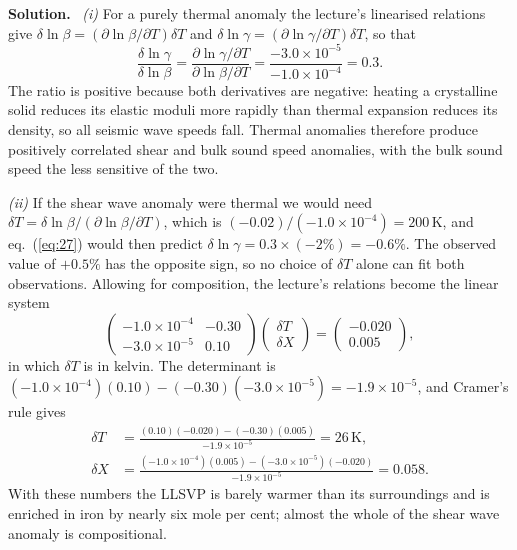 \documentclass[a4paper,12pt]{paper}
\newenvironment{solution}{\par\noindent\textbf{Solution.}\ }{\par\medskip}
\begin{document}
\begin{solution}
\textit{(i)} For a purely thermal anomaly the lecture's linearised relations give
$\delta\ln\beta=(\partial\ln\beta/\partial T)\delta T$ and
$\delta\ln\gamma=(\partial\ln\gamma/\partial T)\delta T$, so that
\begin{equation}
\frac{\delta\ln\gamma}{\delta\ln\beta}=\frac{\partial\ln\gamma/\partial T}{\partial\ln\beta/\partial T}
=\frac{-3.0\times10^{-5}}{-1.0\times10^{-4}}=0.3 .
\label{eq:27}
\end{equation}
The ratio is positive because both derivatives are negative: heating a crystalline solid
reduces its elastic moduli more rapidly than thermal expansion reduces its density, so all
seismic wave speeds fall. Thermal anomalies therefore produce positively correlated shear and
bulk sound speed anomalies, with the bulk sound speed the less sensitive of the two.

\medskip
\noindent\textit{(ii)} If the shear wave anomaly were thermal we would need
$\delta T=\delta\ln\beta/(\partial\ln\beta/\partial T)$, which is
$(-0.02)/(-1.0\times10^{-4})=200\,\mathrm{K}$, and eq.~(\ref{eq:27}) would then predict $\delta\ln\gamma=0.3\times(-2\%)=-0.6\%$. The observed
value of $+0.5\%$ has the opposite sign, so no choice of $\delta T$ alone can fit both
observations. Allowing for composition, the lecture's relations become the linear system
\begin{equation}
\begin{pmatrix}-1.0\times10^{-4}&-0.30\\ -3.0\times10^{-5}&0.10\end{pmatrix}
\begin{pmatrix}\delta T\\ \delta X\end{pmatrix}
=\begin{pmatrix}-0.020\\ 0.005\end{pmatrix},
\label{eq:28}
\end{equation}
in which $\delta T$ is in kelvin. The determinant is
$(-1.0\times10^{-4})(0.10)-(-0.30)(-3.0\times10^{-5})=-1.9\times10^{-5}$, and Cramer's rule gives
\begin{align}
\delta T&=\frac{(0.10)(-0.020)-(-0.30)(0.005)}{-1.9\times10^{-5}}=26\,\mathrm{K},\nonumber\\
\delta X&=\frac{(-1.0\times10^{-4})(0.005)-(-3.0\times10^{-5})(-0.020)}{-1.9\times10^{-5}}=0.058 .
\label{eq:29}
\end{align}
With these numbers the LLSVP is barely warmer than its surroundings and is enriched in iron by
nearly six mole per cent; almost the whole of the shear wave anomaly is compositional.


\end{solution}
\end{document}
